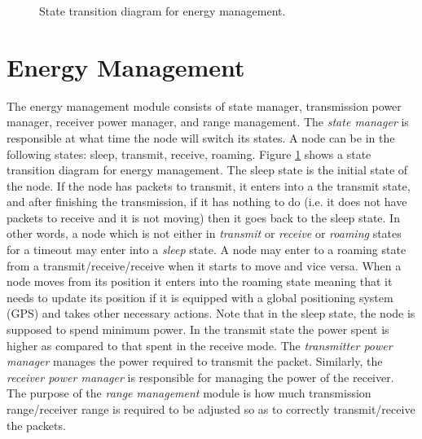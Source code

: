 \documentclass[10pt,times,epsfig,psfig,twocolumn,algorithm,algorithmic]{IEEEtran}
\begin{document}
\begin{figure}
\centerline{}
\caption{State transition diagram for energy management.}
\label{state-transitions}
\end{figure}





\section{Energy Management}
The energy management module consists of state manager, transmission power manager, receiver power manager, and range management. The {\em state manager} is responsible at what time the node will switch its states. A node can be in the following states: sleep, transmit, receive, roaming. Figure \ref{state-transitions} shows a state transition diagram for energy management. The sleep state is the initial state of the node. If the node has packets to transmit, it enters into a the transmit state, and after finishing the transmission, if it has nothing to do (i.e. it does not have packets to receive and it is not moving) then it goes back to the sleep state.  In other words, a node which is not either in {\em transmit} or {\em receive} or {\em roaming} states for a timeout may enter into a {\em sleep} state. A node may enter to a roaming state from a transmit/receive/receive when it starts to move and vice versa. When a node moves from its position it enters into the roaming state meaning that it needs to update its position if it is equipped with a global positioning system (GPS) and takes other necessary actions. Note that in the sleep state, the node is supposed to spend minimum power. In the transmit state the power spent is higher as compared to that spent in the receive mode. The {\em transmitter power manager} manages the power required to transmit the packet. Similarly, the {\em receiver power manager} is responsible for managing the power of the receiver. The purpose of the {\em range management} module is how much transmission range/receiver range is required to be adjusted so as to correctly transmit/receive the packets.
\end{document}
